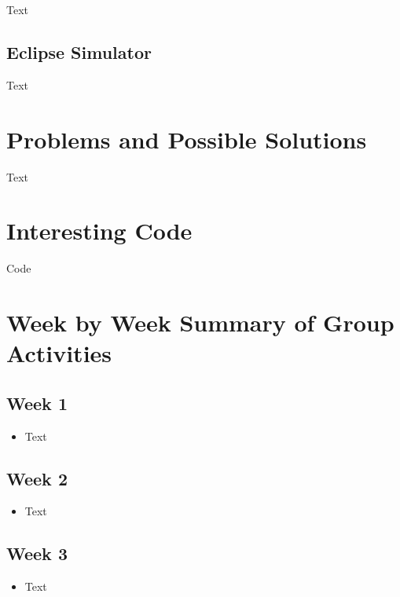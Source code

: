 \documentclass[10pt, onecolumn, draftclsnofoot, letterpaper, compsoc]{IEEEtran}
\begin{document}
Text

\subsection{Eclipse Simulator}

Text

\section{Problems and Possible Solutions}

Text

\section{Interesting Code}

Code

\section{Week by Week Summary of Group Activities}

\subsection{Week 1}

\begin{itemize}

\item Text

\end{itemize}

\subsection{Week 2}

\begin{itemize}

\item Text

\end{itemize}

\subsection{Week 3}

\begin{itemize}

\item Text

\end{itemize}
\end{document}
